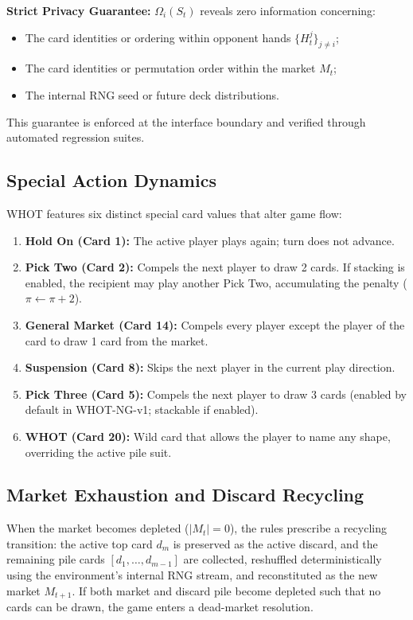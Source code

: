\documentclass[11pt]{article}
\begin{document}
\textbf{Strict Privacy Guarantee:} $\Omega_i(S_t)$ reveals zero information concerning:
\begin{itemize}
  \item The card identities or ordering within opponent hands $\{H_t^j\}_{j \neq i}$;
  \item The card identities or permutation order within the market $M_t$;
  \item The internal RNG seed or future deck distributions.
\end{itemize}

This guarantee is enforced at the interface boundary and verified through automated regression suites.

\subsection{Special Action Dynamics}
WHOT features six distinct special card values that alter game flow:
\begin{enumerate}
  \item \textbf{Hold On (Card 1):} The active player plays again; turn does not advance.
  \item \textbf{Pick Two (Card 2):} Compels the next player to draw 2 cards. If stacking is enabled, the recipient may play another Pick Two, accumulating the penalty ($\pi \leftarrow \pi + 2$).
  \item \textbf{General Market (Card 14):} Compels every player except the player of the card to draw 1 card from the market.
  \item \textbf{Suspension (Card 8):} Skips the next player in the current play direction.
  \item \textbf{Pick Three (Card 5):} Compels the next player to draw 3 cards (enabled by default in WHOT-NG-v1; stackable if enabled).
  \item \textbf{WHOT (Card 20):} Wild card that allows the player to name any shape, overriding the active pile suit.
\end{enumerate}

\subsection{Market Exhaustion and Discard Recycling}
When the market becomes depleted ($|M_t| = 0$), the rules prescribe a recycling transition: the active top card $d_m$ is preserved as the active discard, and the remaining pile cards $[d_1, \dots, d_{m-1}]$ are collected, reshuffled deterministically using the environment's internal RNG stream, and reconstituted as the new market $M_{t+1}$. If both market and discard pile become depleted such that no cards can be drawn, the game enters a dead-market resolution.
\end{document}
